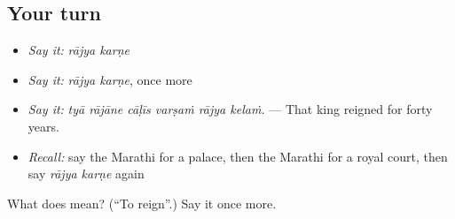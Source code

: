 \subsection*{Your turn}
\begin{itemize}
\raggedright
  \item \emph{Say it:} \emph{rājya karṇe}
  \item \emph{Say it:} \emph{rājya karṇe}, once more
  \item \emph{Say it:} \emph{tyā rājāne cāḷīs varṣaṁ rājya kelaṁ.} — That king reigned for forty years.
  \item \emph{Recall:} say the Marathi for a palace, then the Marathi for a royal court, then say \emph{rājya karṇe} again
\end{itemize}

\begin{tcolorbox}[breakable,colback=teal!4,colframe=teal!35!black,title={Before you move on}]
What does   mean? (\textquotedblleft{}To reign\textquotedblright{}.) Say it once more.
\end{tcolorbox}
